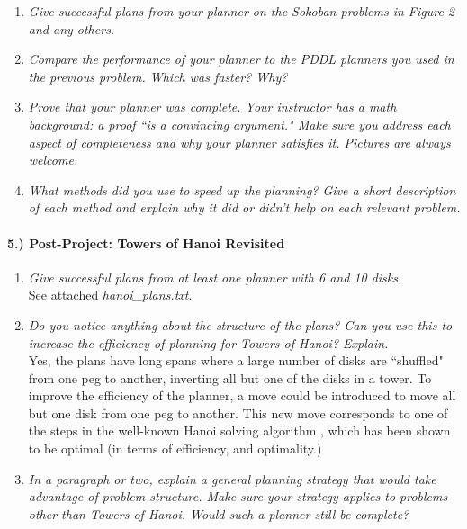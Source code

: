 \documentclass{article}
\begin{document}
\begin{enumerate}
\item{\textit{Give successful plans from your planner on the Sokoban problems in Figure 2 and any others.\\}}
\item{\textit{Compare the performance of your planner to the PDDL planners you used in the previous problem. Which was faster? Why?\\}}
\item{\textit{Prove that your planner was complete. Your instructor has a math background: a proof ``is a convincing argument." Make sure you address each aspect of completeness and why your planner satisfies it. Pictures are always welcome.\\}}
\item{\textit{What methods did you use to speed up the planning? Give a short description of each method and explain why it did or didn’t help on each relevant problem.\\}}
\end{enumerate}

\paragraph{5.) Post-Project: Towers of Hanoi Revisited}

\begin{enumerate}
\item{\textit{Give successful plans from at least one planner with 6 and 10 disks.\\}}
See attached \textit{hanoi\_plans.txt}.

\item{\textit{Do you notice anything about the structure of the plans? Can you use this to increase the efficiency of planning for Towers of Hanoi? Explain.\\}}
Yes, the plans have long spans where a large number of disks are ``shuffled" from one peg to another, inverting all but one of the disks in a tower.  To improve the efficiency of the planner, a move could be introduced to move all but one disk from one peg to another. This new move corresponds to one of the steps in the well-known Hanoi solving algorithm \cite{cutTheKnotHanoiAlgorithm}, which has been shown to be optimal (in terms of efficiency, and optimality.)

\item{\textit{In a paragraph or two, explain a general planning strategy that would take advantage of problem structure. Make sure your strategy applies to problems other than Towers of Hanoi. Would such a planner still be complete?\\}}
\end{enumerate}



\end{document}

